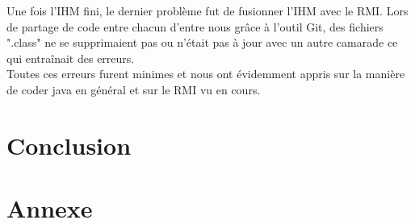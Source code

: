 \documentclass[12,french]{report}
\begin{document}
Une fois l'IHM fini, le dernier problème fut de fusionner l'IHM avec le RMI. Lors de partage de code entre chacun d'entre nous grâce à l'outil Git, des fichiers ".class" ne se supprimaient pas ou n'était pas à jour avec un autre camarade ce qui entraînait des erreurs.\\

Toutes ces erreurs furent minimes et nous ont évidemment appris sur la manière de coder java en général et sur le RMI vu en cours.


\chapter*{Conclusion}



\chapter*{Annexe}
\end{document}
